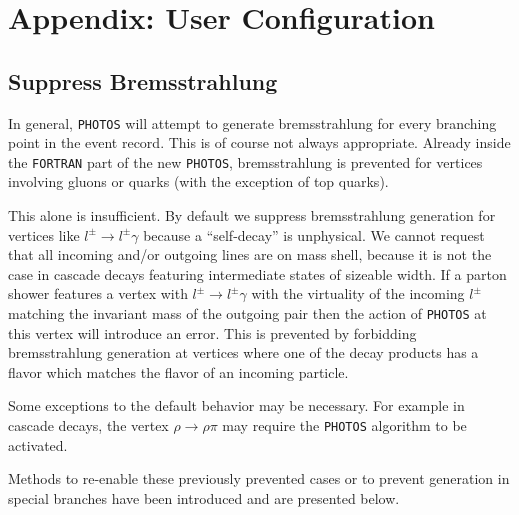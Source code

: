 \documentclass[]{Photos_interface_design}
\begin{document}
\section{Appendix: User Configuration}
\label{sec:User Configuration}

\subsection{Suppress Bremsstrahlung}
\label{section:suppress}

In general, {\tt PHOTOS} will attempt to generate bremsstrahlung for every 
branching point in the event record. This is of course not always appropriate.
Already inside the {\tt FORTRAN} part of the new {\tt PHOTOS}, bremsstrahlung is prevented for vertices involving gluons or quarks 
(with the exception of top quarks).

This alone is insufficient. By default we suppress bremsstrahlung
generation for vertices like $l^\pm \to l^\pm \gamma$ because a
``self-decay'' is unphysical. We cannot request that all incoming
and/or outgoing lines are on mass shell, because it is not the case in
cascade decays featuring intermediate states of sizeable width. If a
parton shower features a vertex with $l^\pm \to l^\pm \gamma$ with the
virtuality of the incoming $l^\pm$ matching the invariant mass of the
outgoing pair then the action of {\tt PHOTOS} at this vertex will
introduce an error.  This is prevented by forbidding bremsstrahlung
generation at vertices where one of the decay products has a flavor
which matches the flavor of an incoming particle.


Some exceptions to the default behavior may be necessary. For example
in cascade decays, the vertex $\rho \to \rho \pi$ may require the
{\tt PHOTOS} algorithm to be activated.

Methods to re-enable these previously prevented cases or to prevent generation in special
branches have been introduced and are presented below. \\ \\ 
\end{document}
